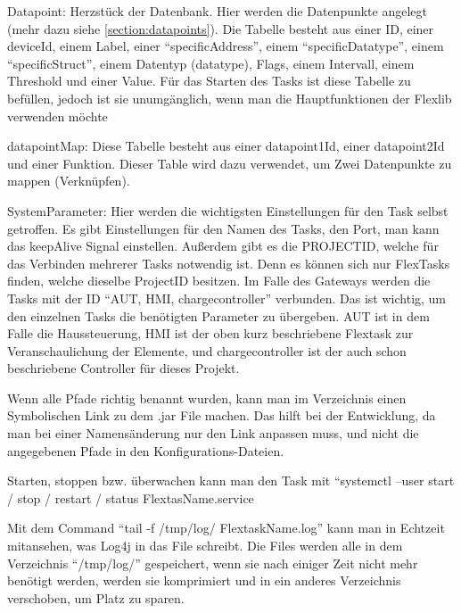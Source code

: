 \begin{compactenum}
\begin{compactenum}
        \item Datapoint: Herzstück der Datenbank. Hier werden die Datenpunkte angelegt (mehr dazu siehe \ref{section:datapoints}). Die Tabelle besteht aus einer ID, einer deviceId, einem Label, einer “specificAddress”, einem “specificDatatype”, einem “specificStruct”, einem Datentyp (datatype), Flags, einem Intervall, einem Threshold und einer Value. Für das Starten des Tasks ist diese Tabelle zu befüllen, jedoch ist sie unumgänglich, wenn man die Hauptfunktionen der Flexlib verwenden möchte 
        \item datapointMap: Diese Tabelle besteht aus einer datapoint1Id, einer datapoint2Id und einer Funktion. Dieser Table wird dazu verwendet, um Zwei Datenpunkte zu mappen (Verknüpfen).  
        \item SystemParameter: Hier werden die wichtigsten Einstellungen für den Task selbst getroffen. Es gibt Einstellungen für den Namen des Tasks, den Port, man kann das keepAlive Signal einstellen. Außerdem gibt es die PROJECTID, welche für das Verbinden mehrerer Tasks notwendig ist. Denn es können sich nur FlexTasks finden, welche dieselbe ProjectID besitzen. Im Falle des Gateways werden die Tasks mit der ID “AUT, HMI, chargecontroller” verbunden. Das ist wichtig, um den einzelnen Tasks die benötigten Parameter zu übergeben. AUT ist in dem Falle die Haussteuerung, HMI ist der oben kurz beschriebene Flextask zur Veranschaulichung der Elemente, und chargecontroller ist der auch schon beschriebene Controller für dieses Projekt. 
    \end{compactenum}
    \item Wenn alle Pfade richtig benannt wurden, kann man im Verzeichnis einen Symbolischen Link zu dem .jar File machen. Das hilft bei der Entwicklung, da man bei einer Namensänderung nur den Link anpassen muss, und nicht die angegebenen Pfade in den Konfigurations-Dateien.  
    \item Starten, stoppen bzw. überwachen kann man den Task mit “systemctl --user start / stop / restart / status FlextasName.service 
    \item Mit dem Command “tail -f /tmp/log/ FlextaskName.log” kann man in Echtzeit mitansehen, was Log4j in das File schreibt. Die Files werden alle in dem Verzeichnis “/tmp/log/” gespeichert, wenn sie nach einiger Zeit nicht mehr benötigt werden, werden sie komprimiert und in ein anderes Verzeichnis verschoben, um Platz zu sparen.  
\end{compactenum}
